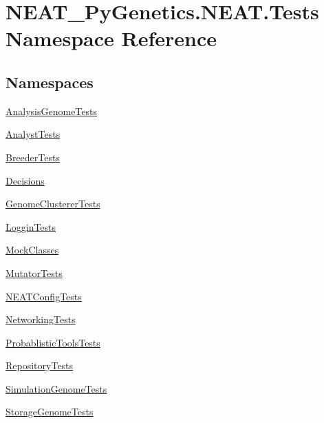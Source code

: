 \hypertarget{namespaceNEAT__PyGenetics_1_1NEAT_1_1Tests}{}\section{N\+E\+A\+T\+\_\+\+Py\+Genetics.\+N\+E\+A\+T.\+Tests Namespace Reference}
\label{namespaceNEAT__PyGenetics_1_1NEAT_1_1Tests}
\subsection*{Namespaces}
\begin{DoxyCompactItemize}
\item 
 \hyperlink{namespaceNEAT__PyGenetics_1_1NEAT_1_1Tests_1_1AnalysisGenomeTests}{Analysis\+Genome\+Tests}
\item 
 \hyperlink{namespaceNEAT__PyGenetics_1_1NEAT_1_1Tests_1_1AnalystTests}{Analyst\+Tests}
\item 
 \hyperlink{namespaceNEAT__PyGenetics_1_1NEAT_1_1Tests_1_1BreederTests}{Breeder\+Tests}
\item 
 \hyperlink{namespaceNEAT__PyGenetics_1_1NEAT_1_1Tests_1_1Decisions}{Decisions}
\item 
 \hyperlink{namespaceNEAT__PyGenetics_1_1NEAT_1_1Tests_1_1GenomeClustererTests}{Genome\+Clusterer\+Tests}
\item 
 \hyperlink{namespaceNEAT__PyGenetics_1_1NEAT_1_1Tests_1_1LogginTests}{Loggin\+Tests}
\item 
 \hyperlink{namespaceNEAT__PyGenetics_1_1NEAT_1_1Tests_1_1MockClasses}{Mock\+Classes}
\item 
 \hyperlink{namespaceNEAT__PyGenetics_1_1NEAT_1_1Tests_1_1MutatorTests}{Mutator\+Tests}
\item 
 \hyperlink{namespaceNEAT__PyGenetics_1_1NEAT_1_1Tests_1_1NEATConfigTests}{N\+E\+A\+T\+Config\+Tests}
\item 
 \hyperlink{namespaceNEAT__PyGenetics_1_1NEAT_1_1Tests_1_1NetworkingTests}{Networking\+Tests}
\item 
 \hyperlink{namespaceNEAT__PyGenetics_1_1NEAT_1_1Tests_1_1ProbablisticToolsTests}{Probablistic\+Tools\+Tests}
\item 
 \hyperlink{namespaceNEAT__PyGenetics_1_1NEAT_1_1Tests_1_1RepositoryTests}{Repository\+Tests}
\item 
 \hyperlink{namespaceNEAT__PyGenetics_1_1NEAT_1_1Tests_1_1SimulationGenomeTests}{Simulation\+Genome\+Tests}
\item 
 \hyperlink{namespaceNEAT__PyGenetics_1_1NEAT_1_1Tests_1_1StorageGenomeTests}{Storage\+Genome\+Tests}
\end{DoxyCompactItemize}
